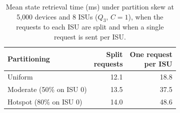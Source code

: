 \begin{table}[t]
\centering
\caption{Mean state retrieval time (ms) under partition skew at 5{,}000 devices and 8 ISUs ($Q_3$, $C=1$), when the requests to each ISU are split and when a single request is sent per ISU.}
\label{tab:query-exp3}
\begin{tabular}{lrr}
\toprule
Partitioning & \makecell{Split\\requests} & \makecell{One request\\per ISU} \\
\midrule
Uniform & 12.1 & 18.8 \\
Moderate (50\% on ISU 0) & 13.5 & 37.5 \\
Hotspot (80\% on ISU 0) & 14.0 & 48.6 \\
\bottomrule
\end{tabular}
\end{table}
